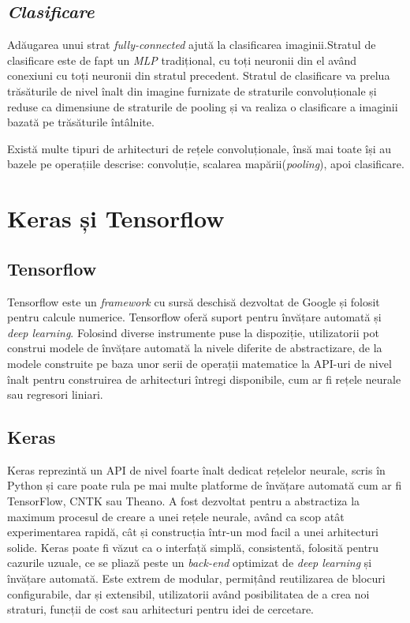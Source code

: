 \subsection{\textit{Clasificare}}
 Adăugarea unui strat \textit{fully-connected} ajută la clasificarea imaginii.Stratul de clasificare este de fapt un \textit{MLP} tradițional, cu toți neuronii din el având conexiuni cu toți neuronii din stratul precedent. Stratul de clasificare va prelua trăsăturile de nivel înalt din imagine furnizate de straturile convoluționale și reduse ca dimensiune de straturile de pooling și va realiza o clasificare a imaginii bazată pe trăsăturile întâlnite.

Există multe tipuri de arhitecturi de rețele convoluționale, însă mai toate își au bazele pe operațiile descrise: convoluție, scalarea mapării(\textit{pooling}), apoi clasificare.


\section{Keras și Tensorflow}
\subsection{Tensorflow}
Tensorflow este un \textit{framework} cu sursă deschisă  dezvoltat de Google și folosit pentru calcule numerice. Tensorflow oferă suport pentru învățare automată și \textit{deep learning}. Folosind diverse instrumente puse la dispoziție, utilizatorii pot construi modele de învățare automată la nivele diferite de abstractizare, de la modele construite pe baza unor serii de operații matematice la API-uri de nivel înalt pentru construirea de arhitecturi întregi disponibile, cum ar fi rețele neurale sau regresori liniari.

\subsection{Keras}
Keras reprezintă un API de nivel foarte înalt dedicat rețelelor neurale, scris în Python și care poate rula pe mai multe platforme de învățare automată cum ar fi TensorFlow, CNTK sau Theano. A fost dezvoltat pentru a abstractiza la maximum procesul de creare a unei rețele neurale, având ca scop atât experimentarea rapidă, cât și construcția într-un mod facil a unei arhitecturi solide. Keras poate fi văzut ca o interfață simplă, consistentă, folosită pentru cazurile uzuale, ce se pliază peste un \textit{back-end} optimizat de \textit{deep learning} și învățare automată. Este extrem de modular, permițând reutilizarea de blocuri configurabile, dar și extensibil, utilizatorii având posibilitatea de a crea noi straturi, funcții de cost sau arhitecturi pentru idei de cercetare. 

